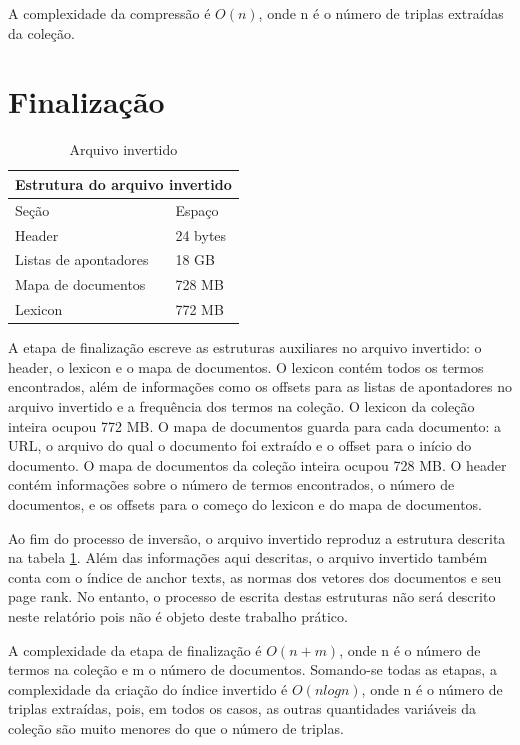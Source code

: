\documentclass{report}
\begin{document}
A complexidade da compressão é $ O(n) $, onde n é o número de triplas extraídas da coleção.

\section{Finalização}

\begin{table}
\centering
\begin{tabular}{ |l|l| }
  \hline
  \multicolumn{2}{|c|}{Estrutura do arquivo invertido} \\
  \hline
  Seção & Espaço \\
  \hline
  Header & 24 bytes \\
  Listas de apontadores & 18 GB \\
  Mapa de documentos & 728 MB \\
  Lexicon & 772 MB \\
  \hline
\end{tabular}
\caption{Arquivo invertido}
\label{tab:inverted_file}
\end{table}

A etapa de finalização escreve as estruturas auxiliares no arquivo invertido: o header, o lexicon e o mapa de documentos.
O lexicon contém todos os termos encontrados, além de informações como os offsets para as listas de apontadores no arquivo invertido
e a frequência dos termos na coleção. O lexicon da coleção inteira ocupou 772 MB.
O mapa de documentos guarda para cada documento: a URL, o arquivo do qual o documento foi extraído e o offset para o início do documento. 
O mapa de documentos da coleção inteira ocupou 728 MB.
O header contém informações sobre o número de termos encontrados, o número de documentos, e os offsets para o começo do lexicon e do mapa de documentos.

Ao fim do processo de inversão, o arquivo invertido reproduz a estrutura descrita na tabela \ref{tab:inverted_file}.
Além das informações aqui descritas, o arquivo invertido também conta com o índice de anchor texts, as normas dos vetores dos documentos e seu page rank. 
No entanto, o processo de escrita destas estruturas não será descrito neste relatório pois não é objeto deste trabalho prático.

A complexidade da etapa de finalização é $ O(n + m) $, onde n é o número de termos na coleção e m o número de documentos. Somando-se todas as etapas,
a complexidade da criação do índice invertido é $ O(nlog n) $, onde n é o número de triplas extraídas, pois, em todos os casos, as outras quantidades 
variáveis da coleção são muito menores do que o número de triplas.
\end{document}
